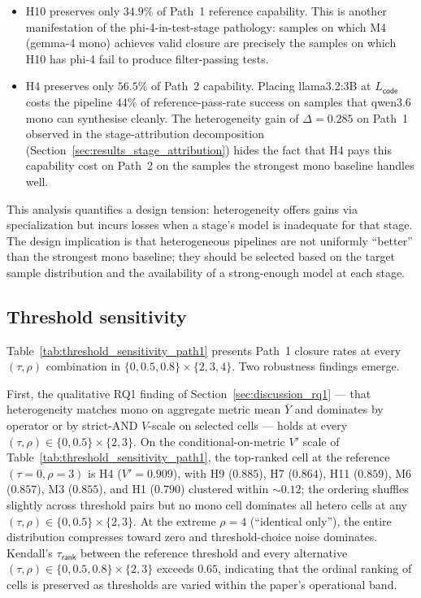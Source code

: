 \begin{itemize}
  \item H10 preserves only $34.9\%$ of Path~1 reference capability. This is another manifestation of the phi-4-in-test-stage pathology: samples on which M4 (gemma-4 mono) achieves valid closure are precisely the samples on which H10 has phi-4 fail to produce filter-passing tests.
  \item H4 preserves only $56.5\%$ of Path~2 capability. Placing llama3.2:3B at $L_{\textsf{code}}$ costs the pipeline $44\%$ of reference-pass-rate success on samples that qwen3.6 mono can synthesise cleanly. The heterogeneity gain of $\Delta = 0.285$ on Path~1 observed in the stage-attribution decomposition (Section~\ref{sec:results_stage_attribution}) hides the fact that H4 pays this capability cost on Path~2 on the samples the strongest mono baseline handles well.
\end{itemize}

This analysis quantifies a design tension: heterogeneity offers gains via specialization but incurs losses when a stage's model is inadequate for that stage. The design implication is that heterogeneous pipelines are not uniformly ``better'' than the strongest mono baseline; they should be selected based on the target sample distribution and the availability of a strong-enough model at each stage.

\subsection{Threshold sensitivity}



Table~\ref{tab:threshold_sensitivity_path1} presents Path~1 closure rates at every $(\tau, \rho)$ combination in $\{0, 0.5, 0.8\} \times \{2, 3, 4\}$. Two robustness findings emerge.

First, the qualitative RQ1 finding of Section~\ref{sec:discussion_rq1} --- that heterogeneity matches mono on aggregate metric mean $\bar{Y}$ and dominates by operator or by strict-AND $V$-scale on selected cells --- holds at every $(\tau, \rho) \in \{0, 0.5\} \times \{2, 3\}$. On the conditional-on-metric $V'$ scale of Table~\ref{tab:threshold_sensitivity_path1}, the top-ranked cell at the reference $(\tau=0, \rho=3)$ is H4 ($V' = 0.909$), with H9 ($0.885$), H7 ($0.864$), H11 ($0.859$), M6 ($0.857$), M3 ($0.855$), and H1 ($0.790$) clustered within $\sim$$0.12$; the ordering shuffles slightly across threshold pairs but no mono cell dominates all hetero cells at any $(\tau, \rho) \in \{0, 0.5\} \times \{2, 3\}$. At the extreme $\rho = 4$ (``identical only''), the entire distribution compresses toward zero and threshold-choice noise dominates. Kendall's $\tau_{\textsf{rank}}$ between the reference threshold and every alternative $(\tau, \rho) \in \{0, 0.5, 0.8\} \times \{2, 3\}$ exceeds $0.65$, indicating that the ordinal ranking of cells is preserved as thresholds are varied within the paper's operational band.

